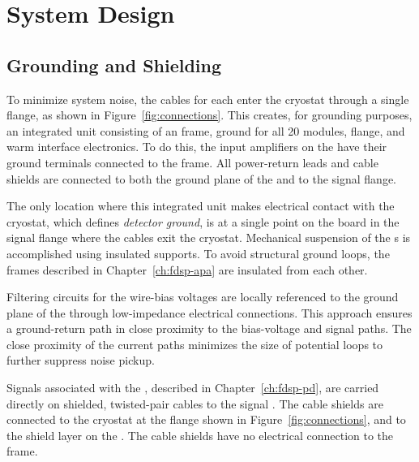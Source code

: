\section{System Design}
\label{sec:fdsp-tpcelec-design}
\subsection{Grounding and Shielding}
\label{sec:fdsp-tpcelec-design-grounding}


To minimize system noise, the  cables for each  enter 
the cryostat through a single  flange, as shown in Figure~\ref{fig:connections}. This creates, for grounding purposes, an integrated unit consisting of an  frame,  ground for all \num{20}  modules,  flange, and warm interface
electronics. To do this,
the input amplifiers on the   have their ground terminals connected to the  frame. 
All power-return leads and cable shields are connected to both the ground plane of the  and to the  signal flange.

The only location where this integrated unit makes electrical contact with the 
cryostat, which defines \textit{detector ground}, is at a single point on the  \fdth board in the  signal flange where the 
cables exit the cryostat. Mechanical suspension of the s is accomplished using insulated supports. 
To avoid structural ground loops, the  frames described in Chapter~\ref{ch:fdsp-apa} are 
insulated from each other.

Filtering circuits for the  wire-bias voltages are locally referenced to the ground plane of the  through low-impedance electrical connections. This approach ensures a ground-return path in close proximity to the bias-voltage and signal paths. The close proximity of the current paths minimizes the size of potential loops to further suppress noise pickup.

Signals associated with the , described in Chapter~\ref{ch:fdsp-pd}, are carried directly on shielded, 
twisted-pair cables to the signal \fdth. The cable shields are connected to the cryostat 
at the  flange shown in Figure~\ref{fig:connections}, and to the  shield layer on the . The cable shields have no electrical connection to the  frame.

